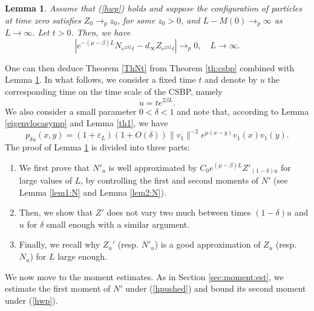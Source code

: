 \documentclass[11pt]{article}
\theoremstyle{plain}
\newtheorem{lemma}{Lemma}[section]
\newcommand\vep{\varepsilon}
\begin{document}
\begin{lemma}\label{lemf}
Assume that (\ref{hwp}) holds and suppose the configuration of particles at time zero satisfies $Z_0\to_p z_0$, for some $z_0>0$,  and   $L-M(0)\rightarrow_p\infty$ as $L\rightarrow \infty$. Let $t>0$. Then, we have 
\begin{equation}
\left| e^{-(\mu-\beta)L}N_{e^{2\beta L}t} - d_\infty Z_{e^{2\beta L}t}\right|\to_p 0, \quad L\to\infty.
\end{equation} 
\end{lemma}
One can then deduce Theorem \ref{ThNt} from Theorem \ref{th:csbp} combined with Lemma \ref{lemf}.
In what follows, we consider a fixed time $t$ and denote by $u$ the corresponding time on the time scale of the CSBP, namely
 \begin{equation*}
 u=te^{2\beta L}.
 \end{equation*}
 We also consider a small parameter $0<\delta<1$ and note that, according to  Lemma \ref{eigenvlocasymp} and Lemma  \ref{th1}, we have
  \begin{equation}
 p_{\delta u}(x,y)= (1+\vep_L)(1+O(\delta))\|v_1\|^{-2}e^{\mu(x-y)}v_1(x)v_1(y).\label{rk:lem:p}
 \end{equation}
 The proof of Lemma \ref{lemf} is divided into three parts:
 \begin{enumerate}
 \item  We first prove that $N'_u$ is well approximated by $C_0e^{(\mu-\beta)L}Z'_{(1-\delta)u}$ for large values of $L$, by controlling the first and second moments of $N'$ (see Lemma \ref{lem1:N} and Lemma \ref{lem2:N}).
 \item Then, we show that $Z'$ does not vary two much between times $(1-\delta)u$ and $u$ for $\delta$ small enough with a similar argument.
 \item Finally, we recall why $Z_u'$ (resp. $N'_u$) is a good approximation of $Z_u$ (resp. $N_u$)  for $L$ large enough.
 \end{enumerate}
We now move to the moment estimates. As in Section \ref{sec:moment:est}, we estimate the first moment of $N'$ under (\ref{hpushed}) and bound its second moment  under (\ref{hwp}).
\end{document}
